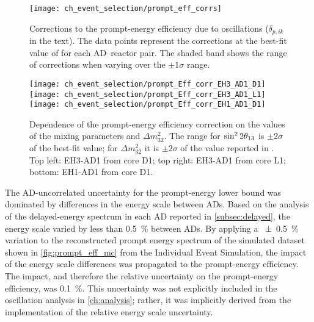 \begin{figure}
    \centering
    \texttt{[image: ch\_event\_selection/prompt\_eff\_corrs]}
    \caption[Prompt efficiency corrections due to oscillation effects]{
        Corrections to the prompt-energy efficiency due to \nuebar{} oscillations
        ($\delta_{p,ik}$ in the text).
        The data points represent the corrections at the best-fit
        value of \thetaot{} for each AD--reactor pair.
        The shaded band shows the range of corrections when varying \thetaot{}
        over the $\pm1\sigma$ range.
    }
    \label{fig:prompt_eff_osc}
\end{figure}

\begin{figure}
    \centering
    \texttt{[image: ch\_event\_selection/prompt\_Eff\_corr\_EH3\_AD1\_D1]}
    \texttt{[image: ch\_event\_selection/prompt\_Eff\_corr\_EH3\_AD1\_L1]}
    \\
    \texttt{[image: ch\_event\_selection/prompt\_Eff\_corr\_EH1\_AD1\_D1]}
    \caption[Prompt efficiency correction contour maps]{
        Dependence of the prompt-energy efficiency correction
        on the values of the mixing parameters \thetaot{} and $\Delta m^2_{32}$.
        The range for $\sin^22\theta_{13}{}$ is $\pm2\sigma$ of the best-fit value;
        for $\Delta m^2_{32}$ it is $\pm2\sigma$ of the value reported in \cite{ngd2018}.
        Top left: EH3-AD1 from core D1;
        top right: EH3-AD1 from core L1;
        bottom: EH1-AD1 from core D1.
    }
    \label{fig:prompt_eff_osc_contour}
\end{figure}

The AD-uncorrelated uncertainty for the prompt-energy lower bound
was dominated by differences in the energy scale between ADs.
Based on the analysis of the delayed-energy spectrum in each AD
reported in \cref{subsec:delayed}, the energy scale
varied by less than \SI{0.5}{\percent} between ADs.
By applying a \SI{+-0.5}{\percent} variation to
the reconstructed prompt energy spectrum of the simulated dataset
shown in \cref{fig:prompt_eff_mc} from the Individual Event Simulation,
the impact of the energy scale differences was propagated
to the prompt-energy efficiency.
The impact, and therefore the relative uncertainty on
the prompt-energy efficiency, was \SI{0.1}{\percent}.
This uncertainty was not explicitly included in the
oscillation analysis in \cref{ch:analysis};
rather, it was implicitly derived from the
implementation of the relative energy scale uncertainty.

